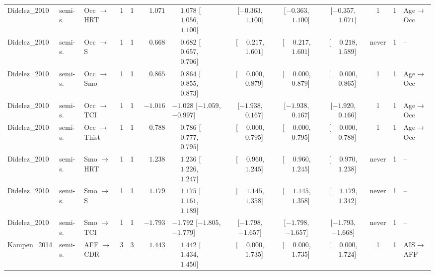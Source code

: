\begin{landscape}
\begin{longtable}{@{}llp{2.15cm}ccrl cccc c l@{}}
Didelez\_2010 & semi-s. & Occ $\to$ HRT & 1 & 1 & $\phantom{-}1.071$ & $\phantom{-}1.078$ [$\phantom{-}1.056$, $\phantom{-}1.100$] & [$-0.363$, $\phantom{-}1.100$] & [$-0.363$, $\phantom{-}1.100$] & [$-0.357$, $\phantom{-}1.071$] & 1 & 1 & Age$\to$Occ \\
Didelez\_2010 & semi-s. & Occ $\to$ S & 1 & 1 & $\phantom{-}0.668$ & $\phantom{-}0.682$ [$\phantom{-}0.657$, $\phantom{-}0.706$] & [$\phantom{-}0.217$, $\phantom{-}1.601$] & [$\phantom{-}0.217$, $\phantom{-}1.601$] & [$\phantom{-}0.218$, $\phantom{-}1.589$] & never & 1 & -- \\
Didelez\_2010 & semi-s. & Occ $\to$ Smo & 1 & 1 & $\phantom{-}0.865$ & $\phantom{-}0.864$ [$\phantom{-}0.855$, $\phantom{-}0.873$] & [$\phantom{-}0.000$, $\phantom{-}0.879$] & [$\phantom{-}0.000$, $\phantom{-}0.879$] & [$\phantom{-}0.000$, $\phantom{-}0.865$] & 1 & 1 & Age$\to$Occ \\
Didelez\_2010 & semi-s. & Occ $\to$ TCI & 1 & 1 & $-1.016$ & $-1.028$ [$-1.059$, $-0.997$] & [$-1.938$, $\phantom{-}0.167$] & [$-1.938$, $\phantom{-}0.167$] & [$-1.920$, $\phantom{-}0.166$] & 1 & 1 & Age$\to$Occ \\
Didelez\_2010 & semi-s. & Occ $\to$ Thist & 1 & 1 & $\phantom{-}0.788$ & $\phantom{-}0.786$ [$\phantom{-}0.777$, $\phantom{-}0.795$] & [$\phantom{-}0.000$, $\phantom{-}0.795$] & [$\phantom{-}0.000$, $\phantom{-}0.795$] & [$\phantom{-}0.000$, $\phantom{-}0.788$] & 1 & 1 & Age$\to$Occ \\
Didelez\_2010 & semi-s. & Smo $\to$ HRT & 1 & 1 & $\phantom{-}1.238$ & $\phantom{-}1.236$ [$\phantom{-}1.226$, $\phantom{-}1.247$] & [$\phantom{-}0.960$, $\phantom{-}1.245$] & [$\phantom{-}0.960$, $\phantom{-}1.245$] & [$\phantom{-}0.970$, $\phantom{-}1.238$] & never & 1 & -- \\
Didelez\_2010 & semi-s. & Smo $\to$ S & 1 & 1 & $\phantom{-}1.179$ & $\phantom{-}1.175$ [$\phantom{-}1.161$, $\phantom{-}1.189$] & [$\phantom{-}1.145$, $\phantom{-}1.358$] & [$\phantom{-}1.145$, $\phantom{-}1.358$] & [$\phantom{-}1.179$, $\phantom{-}1.342$] & never & 1 & -- \\
Didelez\_2010 & semi-s. & Smo $\to$ TCI & 1 & 1 & $-1.793$ & $-1.792$ [$-1.805$, $-1.779$] & [$-1.798$, $-1.657$] & [$-1.798$, $-1.657$] & [$-1.793$, $-1.668$] & never & 1 & -- \\
Kampen\_2014 & semi-s. & AFF $\to$ CDR & 3 & 3 & $\phantom{-}1.443$ & $\phantom{-}1.442$ [$\phantom{-}1.434$, $\phantom{-}1.450$] & [$\phantom{-}0.000$, $\phantom{-}1.735$] & [$\phantom{-}0.000$, $\phantom{-}1.735$] & [$\phantom{-}0.000$, $\phantom{-}1.724$] & 1 & 1 & AIS$\to$AFF \\

\end{longtable}
\end{landscape}
